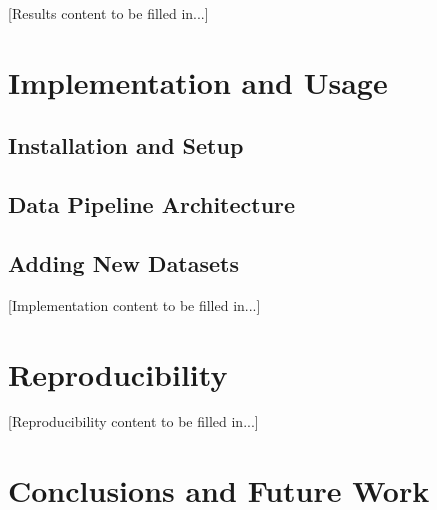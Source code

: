 \documentclass{article}
\begin{document}
[Results content to be filled in...]

\section{Implementation and Usage}
\label{sec:implementation}


\subsection{Installation and Setup}

\subsection{Data Pipeline Architecture}

\subsection{Adding New Datasets}

[Implementation content to be filled in...]

\section{Reproducibility}
\label{sec:reproducibility}


[Reproducibility content to be filled in...]

\section{Conclusions and Future Work}
\label{sec:conclusion}

\end{document}
